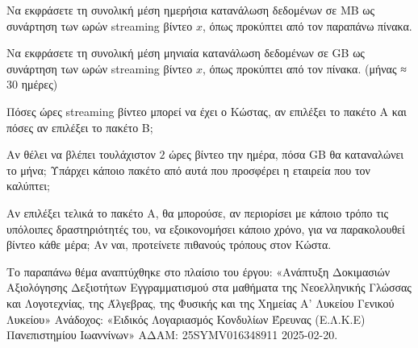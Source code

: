 \begin{alist}
\item Να εκφράσετε τη συνολική μέση ημερήσια κατανάλωση δεδομένων σε MB ως συνάρτηση των ωρών streaming βίντεο $x$, όπως προκύπτει από τον παραπάνω πίνακα.
\item Να εκφράσετε τη συνολική μέση μηνιαία κατανάλωση δεδομένων σε GB ως συνάρτηση των ωρών streaming βίντεο $x$, όπως προκύπτει από τον πίνακα. (μήνας ≈ $30$ ημέρες)
\item Πόσες ώρες streaming βίντεο μπορεί να έχει ο Κώστας, αν επιλέξει το πακέτο Α και πόσες αν επιλέξει το πακέτο Β;
\item Αν θέλει να βλέπει τουλάχιστον $2$ ώρες βίντεο την ημέρα, πόσα GB θα καταναλώνει το μήνα; Υπάρχει κάποιο πακέτο από αυτά που προσφέρει η εταιρεία που τον καλύπτει;
\item Αν επιλέξει τελικά το πακέτο Α, θα μπορούσε, αν περιορίσει με κάποιο τρόπο τις υπόλοιπες δραστηριότητές του, να εξοικονομήσει κάποιο χρόνο, για να παρακολουθεί βίντεο κάθε μέρα; Αν ναι, προτείνετε πιθανούς τρόπους στον Κώστα.

{\footnotesize Το παραπάνω θέμα αναπτύχθηκε στο πλαίσιο του έργου: «Ανάπτυξη Δοκιμασιών Αξιολόγησης Δεξιοτήτων Εγγραμματισμού στα μαθήματα της Νεοελληνικής Γλώσσας και Λογοτεχνίας, της Άλγεβρας, της Φυσικής και της Χημείας Α' Λυκείου Γενικού Λυκείου» Ανάδοχος: «Ειδικός Λογαριασμός Κονδυλίων Έρευνας (Ε.Λ.Κ.Ε) Πανεπιστημίου Ιωαννίνων» ΑΔΑΜ: 25SYMV016348911 2025-02-20.}
\end{alist}

